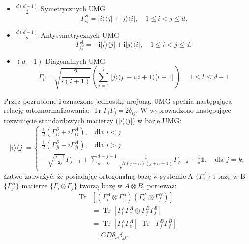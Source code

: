 \documentclass[10pt]{article} %
\DeclareMathOperator{\Trs}{Tr}
\newcommand{\Ket}[1]{|#1\rangle}
\newcommand{\Bra}[1]{\langle#1|}
\newcommand{\I}{\mathbb{1}}
\begin{document}
\begin{appendices}
\begin{itemize}
\item{$\frac{d(d-1)}{2}$ Symetrycznych UMG}
\begin{equation}
\Gamma_{ij}^S = \Ket{i}\Bra{j} + \Ket{j}\Bra{i}, \quad 1 \leq i < j \leq d.
\end{equation}
\item{$\frac{d(d-1)}{2}$ Antysymetrycznych UMG}
\begin{equation}
\Gamma_{ij}^A = -\mathbf{i}\Ket{i}\Bra{j} + \mathbf{i}\Ket{j}\Bra{i}, \quad 1 \leq i < j \leq d.
\end{equation} 
\item{$(d-1)$ Diagonalnych UMG}
\begin{equation}
\Gamma_{i} = \sqrt{\frac{2}{i(i+1)}} \left( \sum_{j=1}^{i } \Ket{j}\Bra{j} - i\Ket{i+1}\Bra{i+1}\right), \quad 1 \leq l \leq d-1
\end{equation}
\end{itemize}
Przez pogrubione $\mathbf{i}$ oznaczono jednostkę urojoną.
UMG spełnia następująca relację ortoznormalizowania: $\Trs \Gamma_i \Gamma_j = 2\delta_{ij}$.
W \cite{gell_mann} wyprowadzono następujące rozwinięcie standardowych macierzy ($\Ket{i}\Bra{j}$) w bazie UMG:
\begin{equation}
\label{gm_ij}
\Ket{i}\Bra{j} =
\begin{cases}
\frac{1}{2} \left(\Gamma_{ij}^S + i \Gamma_{ij}^A\right), \quad \text{dla } i < j \\
\frac{1}{2} \left(\Gamma_{ji}^S - i \Gamma_{ji}^A\right), \quad \text{dla } i > j \\
- \sqrt{\frac{j-1}{2j}} \Gamma_{j-1}  + \sum_{n=0}^{d-j-1} \frac{1}{\sqrt{2(j+n)(j+n+1)}} \Gamma_{j+n} + \frac{1}{d}\I, \quad \text{dla } j=k.
\end{cases}
\end{equation}
Łatwo zauważyć, że posiadając ortogonalną bazę w systemie A $\{\Gamma_i^A\}$ i bazę w B $\{ \Gamma_j^B \}$ macierze $\{\Gamma_i \otimes \Gamma_j\}$ tworzą bazę w $A \otimes B$, ponieważ:
\begin{align}
\Trs& \left[ (\Gamma_i^A \otimes \Gamma_j^B) (\Gamma_e^A \otimes \Gamma_f^B)\right] \\
&= \Trs \left[ \Gamma_i^A \Gamma_e^A \otimes \Gamma_j^B \Gamma_f^B \right] \\
&= \Trs \left[ \Gamma_i^A \Gamma_e^A\right] ~\Trs \left[\Gamma_j^B \Gamma_f^B\right] \\
&= CD \delta_{ie} \delta_{jf}.
\end{align}

\end{appendices}
\end{document}
